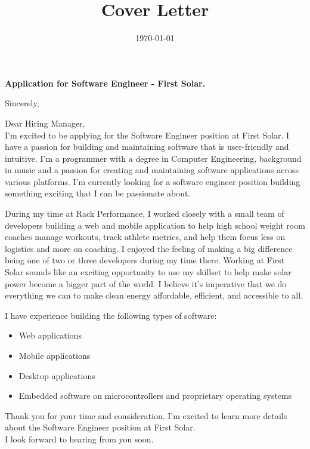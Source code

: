 \documentclass[11pt,a4paper,roman]{moderncv}
\title{\companyName{} Cover Letter}
\newcommand{\companyName}{First Solar}
\newcommand{\companyDivision}{First Solar}
\newcommand{\positionName}{Software Engineer}
\begin{document}
\date{\today}
\opening{\textbf{Application for \positionName{} - \companyDivision.}}
\closing{Sincerely, \vspace{-1em}}



\makelettertitle



Dear Hiring Manager,
\\
\vspace{1em}
I'm excited to be applying for the Software Engineer position at \companyName. I have a passion for building and maintaining software that is user-friendly and intuitive.
I'm a programmer with a degree in Computer Engineering, background in music and a passion for creating and maintaining software applications across various platforms.
I'm currently looking for a software engineer position building something exciting that I can be passionate about.

\vspace{1em}
During my time at Rack Performance, I worked closely with a small team of developers building a web and mobile application to help high school weight room coaches 
manage workouts, track athlete metrics, and help them focus less on logistics and more on coaching. I enjoyed the feeling of making a big difference 
being one of two or three developers during my time there. Working at \companyName{} sounds like an exciting opportunity to use my skillset to help make 
solar power become a bigger part of the world. I believe it's imperative that we do everything we can to make clean energy affordable, efficient, and
accessible to all.
\vspace{1em}

I have experience building the following types of software:
\vspace{0.5em}
\begin{itemize}
\item Web applications
\item Mobile applications
\item Desktop applications
\item Embedded software on microcontrollers and proprietary operating systems
\end{itemize}

\vspace{1em}
Thank you for your time and consideration. I'm excited to learn more details about the \positionName{} 
position at \companyName. \\

\vspace{1em}
I look forward to hearing from you soon.

\vspace{0.5cm}


\makeletterclosing
\end{document}
